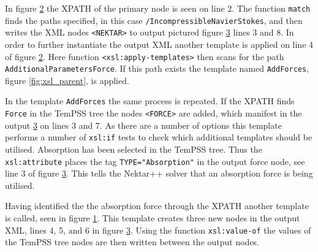 \documentclass[11pt, a4paper]{report}
\begin{document}
In figure \ref{fig:xsl_final} the XPATH of the primary node is seen on line 2. The function \texttt{match} finds the paths specified, in this case \texttt{/IncompressibleNavierStokes}, and then writes the XML nodes \texttt{<NEKTAR>} to output pictured figure \ref{fig:xml_output} lines 3 and 8. In order to further instantiate the output XML another template is applied on line 4 of figure \ref{fig:xsl_final}. Here function \texttt{<xsl:apply-templates>} then scans for the path \texttt{AdditionalParametersForce}. If this path exists the template named \texttt{AddForces}, figure \ref{fig:xsl_parent}, is applied.

In the template \texttt{AddForces} the same process is repeated. If the XPATH finds \texttt{Force} in the TemPSS tree the nodes \texttt{<FORCE>} are added, which manifest in the output \ref{fig:xml_output} on lines 3 and 7. As there are a number of options this template performs a number of \texttt{xsl:if} tests to check which additional templates should be utilised. Absorption has been selected in the TemPSS tree. Thus the \texttt{xsl:attribute} places the tag \texttt{TYPE="Absorption"} in the output force node, see line 3 of figure \ref{fig:xml_output}. This tells the Nektar++ solver that an absorption force is being utilised.

\begin{figure}[htb!]
 \centering
 
 \label{fig:xsl_child}
\end{figure}

\begin{figure}[htb!]
 \centering
 
 \label{fig:xsl_final}
\end{figure}

Having identified the the absorption force through the XPATH another template is called, seen in figure \ref{fig:xsl_child}. This template creates three new nodes in the output XML, lines 4, 5, and 6 in figure \ref{fig:xml_output}. Using the function \texttt{xsl:value-of} the values of the TemPSS tree nodes are then written between the output nodes.

\begin{figure}[htb!]
 \centering
 
 \label{fig:xml_output}
\end{figure}
\end{document}
